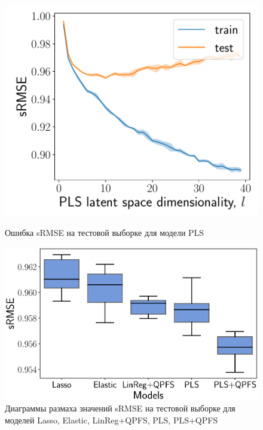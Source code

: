 \begin{figure}[ht]
	\begin{minipage}{.45\linewidth}
		\vspace{-0.9cm}
		\centering
		\includegraphics[width=1.\linewidth]{figs/ch3/pls_vs_k}
		\caption{ Ошибка sRMSE на тестовой выборке для модели PLS}
		\label{ch3:fig:pls_vs_k}
	\end{minipage}%
	\begin{minipage}{.55\linewidth}
		\vspace{0.3cm}
		\centering
		\includegraphics[width=1.\linewidth]{figs/ch3/models2}
		\caption{Диаграммы размаха значений sRMSE на тестовой выборке для моделей Lasso, Elastic, LinReg+QPFS, PLS, PLS+QPFS}
		\label{ch3:fig:models}
	\end{minipage}
\end{figure}
